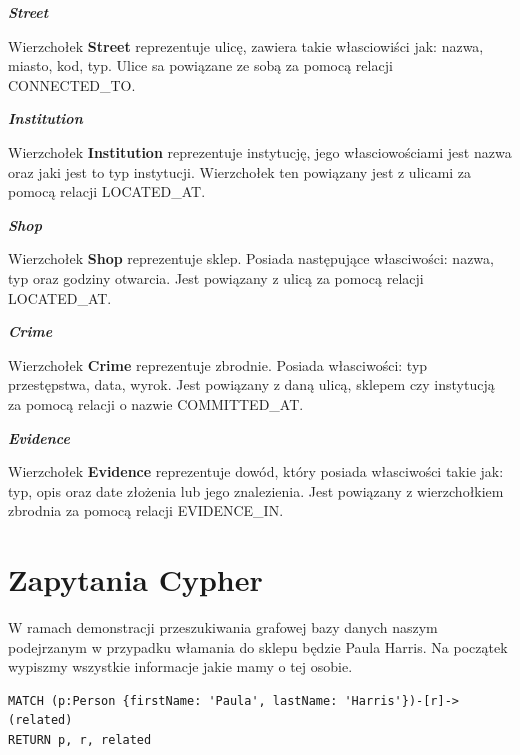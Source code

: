 \documentclass[a4paper,12pt]{article}
\begin{document}
\begin{center}
    \textbf{\textit{Street}}
\end{center}

Wierzchołek \textbf{Street} reprezentuje ulicę, zawiera takie własciowiści jak: nazwa, miasto, kod, typ. Ulice sa powiązane ze sobą za pomocą relacji CONNECTED\_TO.

\begin{center}
    \textbf{\textit{Institution}}
\end{center}

Wierzchołek \textbf{Institution} reprezentuje instytucję, jego własciowościami jest nazwa oraz jaki jest to typ instytucji. Wierzchołek ten powiązany jest z ulicami za pomocą relacji LOCATED\_AT.

\begin{center}
    \textbf{\textit{Shop}}
\end{center}

Wierzchołek \textbf{Shop} reprezentuje sklep. Posiada następujące własciwości: nazwa, typ oraz godziny otwarcia. Jest powiązany z ulicą za pomocą relacji LOCATED\_AT.

\begin{center}
    \textbf{\textit{Crime}}
\end{center}

Wierzchołek \textbf{Crime} reprezentuje zbrodnie. Posiada własciwości: typ przestępstwa, data, wyrok. Jest powiązany z daną ulicą, sklepem czy instytucją za pomocą relacji o nazwie COMMITTED\_AT.

\begin{center}
    \textbf{\textit{Evidence}}
\end{center}

Wierzchołek \textbf{Evidence} reprezentuje dowód, który posiada własciwości takie jak: typ, opis oraz date złożenia lub jego znalezienia. Jest powiązany z wierzchołkiem zbrodnia za pomocą relacji EVIDENCE\_IN.

\section{Zapytania Cypher}

W ramach demonstracji przeszukiwania grafowej bazy danych naszym podejrzanym w przypadku włamania do sklepu będzie Paula Harris. Na początek wypiszmy wszystkie informacje jakie mamy o tej osobie.

\begin{center}
\begin{minipage}{0.8\linewidth}
\begin{lstlisting}[language=Cypher, basicstyle=\small, breaklines=true]
MATCH (p:Person {firstName: 'Paula', lastName: 'Harris'})-[r]->(related)
RETURN p, r, related
\end{lstlisting}
\end{minipage}
\end{center}
\end{document}
